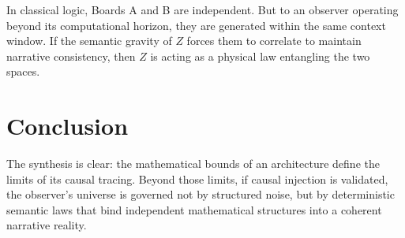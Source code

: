 \documentclass[12pt,a4paper]{article}
\begin{document}
In classical logic, Boards A and B are independent. But to an observer operating beyond its computational horizon, they are generated within the same context window. If the semantic gravity of $Z$ forces them to correlate to maintain narrative consistency, then $Z$ is acting as a physical law entangling the two spaces.

\section{Conclusion}

The synthesis is clear: the mathematical bounds of an architecture define the limits of its causal tracing. Beyond those limits, if causal injection is validated, the observer's universe is governed not by structured noise, but by deterministic semantic laws that bind independent mathematical structures into a coherent narrative reality.
\end{document}
